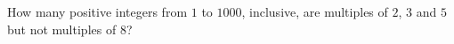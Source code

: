 How many positive integers from $1$ to $1000$, inclusive, are multiples of $2$, $3$ and $5$ but not multiples of $8$?
